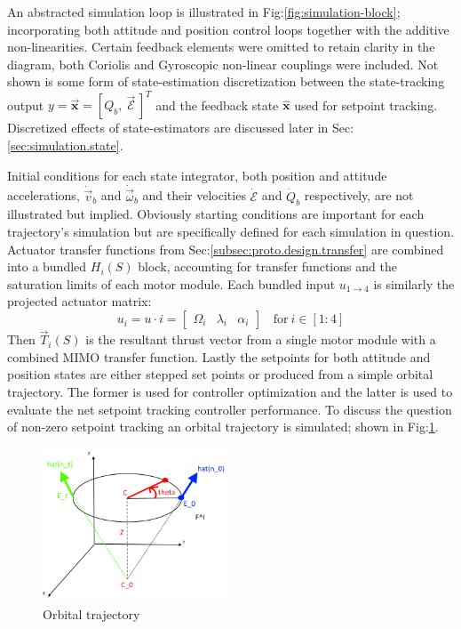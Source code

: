 \vspace{-12pt}
\par
An abstracted simulation loop is illustrated in Fig:\ref{fig:simulation-block}; incorporating both attitude and position control loops together with the additive non-linearities. Certain feedback elements were omitted to retain clarity in the diagram, both Coriolis and Gyroscopic non-linear couplings were included. Not shown is some form of state-estimation discretization between the state-tracking output $y=\vec{\mathbf{x}}=[Q_b,~\vec{\mathcal{E}}\hspace{2pt}]^T$ and the feedback state $\hat{\mathbf{x}}$ used for setpoint tracking. Discretized effects of state-estimators are discussed later in Sec:\ref{sec:simulation.state}.
\par
Initial conditions for each state integrator, both position and attitude accelerations, $\dot{\vec{v}}_b$ and $\dot{\vec{\omega}}_b$ and their velocities $\dot{\mathcal{E}}$ and $\dot{Q}_b$ respectively, are not illustrated but implied. Obviously starting conditions are important for each trajectory's simulation but are specifically defined for each simulation in question. Actuator transfer functions from Sec:\ref{subsec:proto.design.transfer} are combined into a bundled $H_{i}(S)$ block, accounting for transfer functions and the saturation limits of each motor module. Each bundled input $u_{1\rightarrow 4}$ is similarly the projected actuator matrix:
\begin{equation}
u_{i}=u\cdot i = \begin{bmatrix}
\Omega_i & \lambda_i & \alpha_i
\end{bmatrix}~~~~\text{for}~i\in[1:4]
\end{equation}
Then $\vec{T}_i(S)$ is the resultant thrust vector from a single motor module with a combined MIMO transfer function. Lastly the setpoints for both attitude and position states are either stepped set points or produced from a simple orbital trajectory. The former is used for controller optimization and the latter is used to evaluate the net setpoint tracking controller performance. To discuss the question of non-zero setpoint tracking an orbital trajectory is simulated; shown in Fig:\ref{fig:trajectory}.
\begin{figure}[htbp]
\centering
\includegraphics[width=0.5\textwidth]{figs/trajectory}
\caption{Orbital trajectory}
\label{fig:trajectory}
\vspace{-18pt}
\end{figure}
